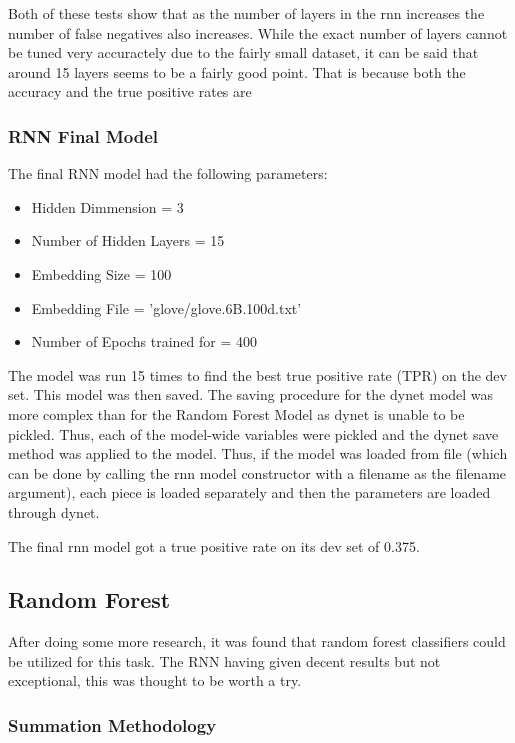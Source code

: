 \documentclass[twoside,twocolumn]{article}
\begin{document}
Both of these tests show that as the number of layers in the rnn increases the number of false
negatives also increases. While the exact number of layers cannot be tuned very accuractely
due to the fairly small dataset, it can be said that around 15 layers seems to be a fairly good point. 
That is because both the accuracy and the true positive rates are 


\subsubsection{RNN Final Model}

The final RNN model had the following parameters:
\begin{itemize}
\item Hidden Dimmension = 3
\item Number of Hidden Layers = 15
\item Embedding Size = 100
\item Embedding File = 'glove/glove.6B.100d.txt'
\item Number of Epochs trained for = 400 
\end{itemize}

The model was run 15 times to find the best true positive rate (TPR) on the dev set.
This model was then saved. The saving procedure for the dynet model was more complex than
for the Random Forest Model as dynet is unable to be pickled. Thus, each of the model-wide
variables were pickled and the dynet save method was applied to the model. Thus, if the model
was loaded from file (which can be done by calling the rnn model constructor with a filename
as the filename argument), each piece is loaded separately and then the parameters are loaded
through dynet.

The final rnn model got a true positive rate on its dev set of 0.375.

\subsection{Random Forest}

After doing some more research, it was found that random forest classifiers could
be utilized for this task. The RNN having given decent results but not exceptional,
this was thought to be worth a try.

\subsubsection{Summation Methodology}
\end{document}
